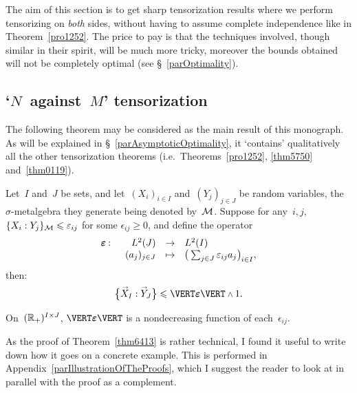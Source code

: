The aim of this section is to get sharp tensorization results
where we perform tensorizing on \emph{both} sides,
without having to assume complete independence like in Theorem~\ref{pro1252}.
The price to pay is that the techniques involved,
though similar in their spirit, will be much more tricky,
moreover the bounds obtained will not be completely optimal
(see \S~\ref{parOptimality}).


\subsection{`\texorpdfstring{$N$}{N}~against~\texorpdfstring{$M$}{M}' tensorization}

The following theorem may be considered as the main result of this monograph.
As will be explained in \S~\ref{parAsymptoticOptimality},
it `contains' qualitatively all the other tensorization theorems
(i.e.\ Theorems~\ref{pro1252}, \ref{thm5750} and~\ref{thm0119}).

\begin{Thm}\label{thm6413}
Let~$I$ and~$J$ be sets, and let~$(X_i)_{i\in I}$ and~$(Y_j)_{j\in J}$ be random variables,
the $\sigma$-metalgebra they generate being denoted by~$\mathcal{M}$.
Suppose for any~$i,j$, ${\{X_i:Y_j\}_{\mathcal{M}}} \leqslant \varepsilon_{ij}$ for some $\epsilon_{ij} \geq 0$,
and define the operator
\[ \begin{array}{rrcl} \boldepsilon \colon & L^2(J) & \to & L^2(I) \\
& (a_j)_{j\in J} & \mapsto & \big( \sum_{j\in J} \epsilon_{ij}a_j \big)_{i\in I} ,\end{array} \]
then:
\[\label{for3009} \big\{ \vec{X}_I : \vec{Y}_J \big\} \leq \VERT \boldepsilon \VERT \wedge 1 .\]
\end{Thm}

\begin{Rmk}
On~$(\mathbb{R}_+)^{I\times J}$, $\VERT \boldepsilon \VERT$
is a nondecreasing function of each~$\epsilon_{ij}$.
\end{Rmk}

\begin{NOTA}
As the proof of Theorem~\ref{thm6413} is rather technical,
I found it useful to write down how it goes on a concrete example.
This is performed in Appendix~\ref{parIllustrationOfTheProofs},
which I suggest the reader to look at in parallel with the proof as a complement.
\end{NOTA}

